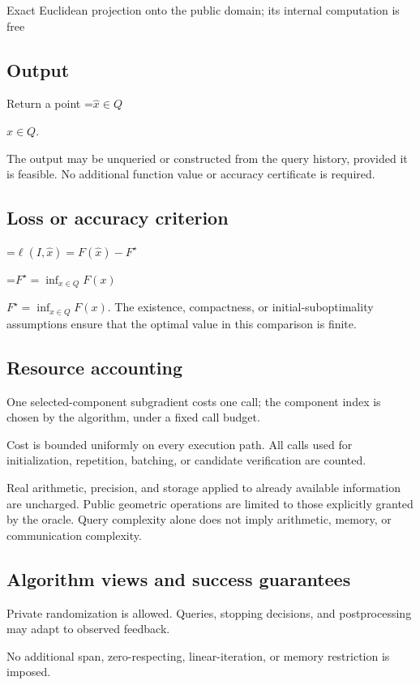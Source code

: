 \documentclass[10pt,a4paper]{article}
\newcommand{\AtlasMath}[1]{\par\begingroup\centering\setbox0=\hbox{$\displaystyle #1$}\ifdim\wd0>1.4\linewidth\typeout{ATLAS WIDE FORMULA: \the\wd0}\fi\ifdim\wd0>\linewidth\resizebox{\linewidth}{!}{\box0}\else\box0\fi\par\endgroup}
\newcommand{\AtlasInlineMath}[1]{\begingroup\setbox0=\hbox{$#1$}\ifdim\wd0>.4\linewidth\endgroup\AtlasMath{#1}\else\endgroup$#1$\fi}
\begin{document}
Exact Euclidean projection onto the public domain; its internal computation is free

\subsection{Output}
Return a point \AtlasInlineMath{\widehat x\in Q}.

The output may be unqueried or constructed from the query history, provided it is feasible. No additional function value or accuracy certificate is required.

\subsection{Loss or accuracy criterion}

\AtlasMath{\ell(I,\widehat{x})=F(\widehat{x})-F^\star}


\AtlasInlineMath{F^\star=\inf_{x\in Q}F(x)}. The existence, compactness, or initial-suboptimality assumptions ensure that the optimal value in this comparison is finite.

\subsection{Resource accounting}
One selected-component subgradient costs one call; the component index is chosen by the algorithm, under a fixed call budget.

Cost is bounded uniformly on every execution path. All calls used for initialization, repetition, batching, or candidate verification are counted.

Real arithmetic, precision, and storage applied to already available information are uncharged. Public geometric operations are limited to those explicitly granted by the oracle. Query complexity alone does not imply arithmetic, memory, or communication complexity.

\subsection{Algorithm views and success guarantees}
Private randomization is allowed. Queries, stopping decisions, and postprocessing may adapt to observed feedback.

No additional span, zero-respecting, linear-iteration, or memory restriction is imposed.
\end{document}
